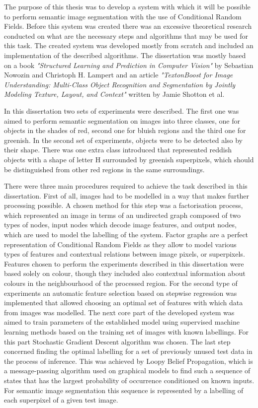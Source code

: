 The purpose of this thesis was to develop a system with which it will be possible to perform semantic image segmentation with the use of Conditional Random Fields. Before this system was created there was an excessive theoretical research conducted on what are the necessary steps and algorithms that may be used for this task. The created system was developed mostly from scratch and included an implementation of the described algorithms. The dissertation was mostly based on a book \textit{"Structured Learning and Prediction in Computer Vision"} by Sebastian Nowozin and Christoph H. Lampert and an article \textit{"TextonBoost for Image Understanding: Multi-Class Object Recognition and Segmentation by Jointly Modeling Texture, Layout, and Context"} written by Jamie Shotton et al. 

In this dissertation two sets of experiments were described. The first one was aimed to perform semantic segmentation on images into three classes, one for objects in the shades of red, second one for bluish regions and the third one for greenish. In the second set of experiments, objects were to be detected also by their shape. There was one extra class introduced that represented reddish objects with a shape of letter H surrounded by greenish superpixels, which should be distinguished from other red regions in the same surroundings. 

There were three main procedures required to achieve the task described in this dissertation. First of all, images had to be modelled in a way that makes further processing possible. A chosen method for this step was a factorisation process, which represented an image in terms of an undirected graph composed of two types of nodes, input nodes which decode image features, and output nodes, which are used to model the labelling of the system. Factor graphs are a perfect representation of Conditional Random Fields as they allow to model various types of features and contextual relations between image pixels, or superpixels. Features chosen to perform the experiments described in this dissertation were  based solely on colour, though they included also contextual information about colours in the neighbourhood of the processed region. For the second type of experiments an automatic feature selection based on stepwise regression was implemented that allowed choosing an optimal set of features with which data from images was modelled. The next core part of the developed system was aimed to train parameters of the established model using supervised machine learning methods based on the training set of images with known labellings. For this part Stochastic Gradient Descent algorithm was chosen. The last step concerned finding the optimal labelling for a set of previously unused test data in the process of inference. This was achieved by Loopy Belief Propagation, which is a message-passing algorithm used on graphical models to find such a sequence of states that has the largest probability of occurrence conditioned on known inputs. For semantic image segmentation this sequence is represented by a labelling of each superpixel of a given test image.

